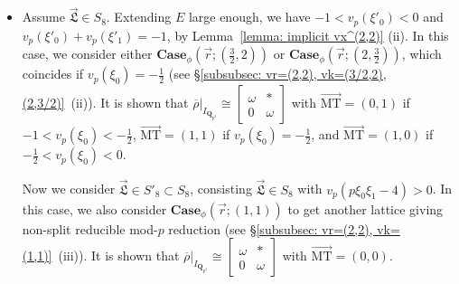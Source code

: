 \documentclass[11pt]{amsart}
\theoremstyle{definition}
\numberwithin{equation}{subsection}
\theoremstyle{plain}
\theoremstyle{plain}
\theoremstyle{plain}
\theoremstyle{plain}
\theoremstyle{plain}
\theoremstyle{plain}
\theoremstyle{plain}
\theoremstyle{plain}
\theoremstyle{plain}
\theoremstyle{plain}
\theoremstyle{plain}
\theoremstyle{plain}
\theoremstyle{definition}
\theoremstyle{definition}
\theoremstyle{definition}
\theoremstyle{remark}
\renewcommand{\(}{\textup{(}}
\renewcommand{\)}{\textup{)}}
\newcommand{\Q}{\mathbf{Q}}
\newcommand{\rhobar}{\overline{\rho}}
\newcommand{\fL}{\mathfrak{L}}
\newcommand{\vr}{\vec{r}}
\newcommand{\vL}{\vec{\fL}}
\newcommand{\IQptwo}{{I_{\Q_{p^2}}}}
\begin{document}
\begin{itemize}[leftmargin=*]
\item Assume $\vL\in S_8$. Extending $E$ large enough, we have $-1<v_p(\xi'_0)<0$ and $v_p(\xi'_0)+v_p(\xi'_1)=-1$, by Lemma~\ref{lemma: implicit vx^(2,2)} (ii). In this case, we consider either $\mathbf{Case}_\phi(\vr;(\frac{3}{2},2))$ or $\mathbf{Case}_\phi(\vr;(2,\frac{3}{2}))$, which coincides if $v_p(\xi_0)=-\frac{1}{2}$ (see \S\ref{subsubsec: vr=(2,2), vk=(3/2,2),(2,3/2)}~(ii)). It is shown that $\rhobar|_\IQptwo\cong
\begin{bmatrix}
    \omega & * \\ 0 & \omega
\end{bmatrix}$ with $\vec{\mathrm{MT}}=(0,1)$ if $-1<v_p(\xi_0)<-\frac{1}{2}$, $\vec{\mathrm{MT}}=(1,1)$ if $v_p(\xi_0)=-\frac{1}{2}$, and $\vec{\mathrm{MT}}=(1,0)$ if $-\frac{1}{2}<v_p(\xi_0)<0$. 

Now we consider $\vL\in S'_8\subset S_8$, consisting $\vL\in S_8$ with $v_p(p\xi_0\xi_1-4)>0$. In this case, we also consider $\mathbf{Case}_\phi(\vr;(1,1))$ to get another lattice giving non-split reducible mod-$p$ reduction (see \S\ref{subsubsec: vr=(2,2), vk=(1,1)}~(iii)). It is shown that $\rhobar|_\IQptwo\cong
\begin{bmatrix}
    \omega & * \\ 0 & \omega
\end{bmatrix}$ with $\vec{\mathrm{MT}}=(0,0)$.


\end{itemize}
\end{document}
